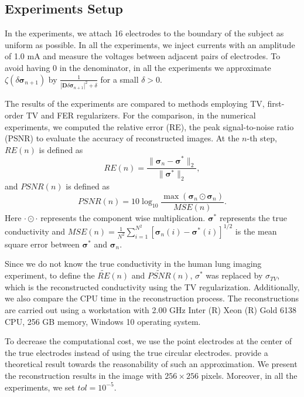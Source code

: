 \documentclass[lettersize,journal]{IEEEtran}
\def\D{\mathbf{D}}
\def\f{\frac}
\def\bmsigma{\bm{\sigma}}
\begin{document}
\subsection{Experiments Setup}
In the experiments, we attach 16 electrodes to the boundary of the subject as uniform as possible. In all the experiments, we inject currents with an amplitude of 1.0 mA and measure the voltages between adjacent pairs of electrodes. To avoid having $0$ in the denominator, in all the experiments we approximate $\zeta(\delta \bm\sigma_{n+1})$ by $\f{1}{|\D \delta\bmsigma_{n+1}|^2+\delta}$ for a small $\delta>0$.


The results of the experiments are compared to methods employing TV, first-order TV and FER regularizers. For the comparison, in the numerical experiments, we computed the relative error (RE), the peak signal-to-noise ratio (PSNR) to evaluate the accuracy of reconstructed images.
At the $n$-th step, $RE(n)$ is defined as
\begin{equation*}\label{RE}
RE(n)=\frac{\|\bm{\sigma}_n-\bm{\sigma}^{\ast}\|_2}{\|\bm{\sigma}^{\ast}\|_2},
\end{equation*}
and $PSNR(n)$ is defined as
\begin{equation*}
\label{psnr}
PSNR(n) = 10 \log_{10}\frac{\max(\bm{\sigma}_{n}\odot \bm{\sigma}_{n})}{MSE(n)}.
\end{equation*}
Here $\cdot\odot\cdot $ represents the component wise multiplication. $\bm{\sigma}^{\ast}$ represents the true conductivity and $MSE(n) = \frac{1}{N^2}\sum_{i=1}^{N^2}\left[\bm{\sigma}_n(i)-\bm{\sigma}^\ast(i)\right]^{1/2}$ is the mean square error between $\bm{\sigma}^{\ast}$ and $\bm{\sigma}_{n}$.

Since we do not know the true conductivity in the human lung imaging experiment,
to define the $\widetilde{RE}(n)$ and $\widetilde{PSNR}(n)$,
$\sigma^*$ was replaced by $\sigma_{TV}$, which is the reconstructed conductivity using the TV regularization.
Additionally, we also compare the CPU time in the reconstruction process.
The reconstructions are carried out using  a workstation with 2.00 GHz Inter (R) Xeon (R) Gold 6138 CPU, 256 GB memory, Windows 10 operating system.

To decrease the computational cost, we use the point electrodes at the center of the true electrodes instead of using the true circular electrodes.
\cite{Hanke2011} provide a theoretical result towards the reasonability of such an approximation. We present the reconstruction results in the image with $256\times 256$ pixels. Moreover, in all the experiments, we set $tol = 10^{-5}$.
\end{document}
